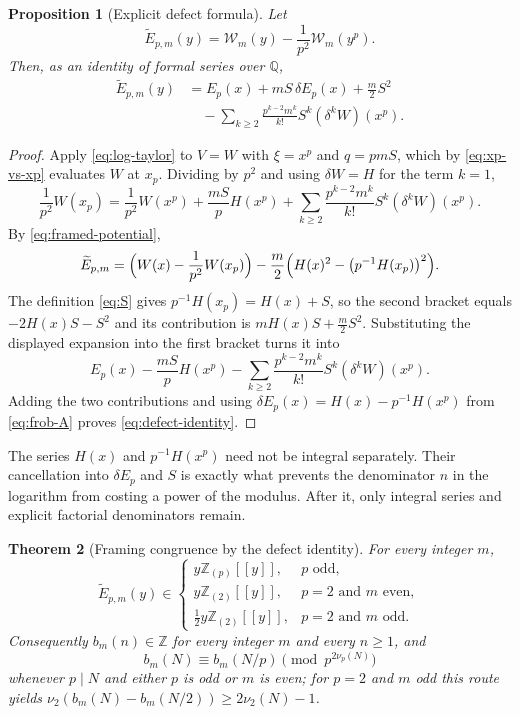 \documentclass[11pt,letterpaper]{article}
\numberwithin{equation}{section}
\newtheorem{theorem}{Theorem}[section]
\newtheorem{proposition}[theorem]{Proposition}
\theoremstyle{definition}
\newcommand{\Z}{\mathbb Z}
\newcommand{\Q}{\mathbb Q}
\newcommand{\Zp}{\Z_{(p)}}
\newcommand{\Ztwo}{\Z_{(2)}}
\newcommand{\dd}{\delta}
\newcommand{\Wm}{\mathcal W}
\begin{document}
\begin{proposition}[Explicit defect formula]\label{prop:defect-identity}
Let
\begin{equation}\label{eq:framed-defect}
\widetilde E_{p,m}(y)=\Wm_m(y)-\frac1{p^2}\Wm_m(y^p).
\end{equation}
Then, as an identity of formal series over $\Q$,
\begin{equation}\label{eq:defect-identity}
\boxed{\begin{aligned}
\widetilde E_{p,m}(y)
&=E_p(x)+mS\,\dd E_p(x)+\frac m2S^2\\
&\quad-\sum_{k\geq2}\frac{p^{k-2}m^k}{k!}S^k(\dd^kW)(x^p).
\end{aligned}}
\end{equation}
\end{proposition}

\begin{proof}
Apply \eqref{eq:log-taylor} to $V=W$ with $\xi=x^p$ and
$q=pmS$, which by \eqref{eq:xp-vs-xp} evaluates $W$ at $x_p$. Dividing by
$p^2$ and using $\dd W=H$ for the term $k=1$,
\[
\frac1{p^2}W(x_p)
=\frac1{p^2}W(x^p)+\frac{mS}{p}H(x^p)
 +\sum_{k\geq2}\frac{p^{k-2}m^k}{k!}S^k(\dd^kW)(x^p).
\]
By \eqref{eq:framed-potential},
\[
\widetilde E_{p,m}
=\Bigl(W(x)-\frac1{p^2}W(x_p)\Bigr)
 -\frac m2\Bigl(H(x)^2-\bigl(p^{-1}H(x_p)\bigr)^2\Bigr).
\]
The definition \eqref{eq:S} gives $p^{-1}H(x_p)=H(x)+S$, so the second
bracket equals $-2H(x)S-S^2$ and its contribution is
$mH(x)S+\frac m2S^2$. Substituting the displayed expansion into the
first bracket turns it into
\[
E_p(x)-\frac{mS}{p}H(x^p)
-\sum_{k\geq2}\frac{p^{k-2}m^k}{k!}S^k(\dd^kW)(x^p).
\]
Adding the two contributions and using
$\dd E_p(x)=H(x)-p^{-1}H(x^p)$ from \eqref{eq:frob-A} proves
\eqref{eq:defect-identity}.
\end{proof}

The series $H(x)$ and $p^{-1}H(x^p)$ need not be integral separately.
Their cancellation into $\dd E_p$ and $S$ is exactly what prevents the
denominator $n$ in the logarithm from costing a power of the modulus.
After it, only integral series and explicit factorial denominators remain.

\begin{theorem}[Framing congruence by the defect identity]\label{thm:defect-route}
For every integer $m$,
\begin{equation}\label{eq:defect-integrality}
\widetilde E_{p,m}(y)\in
\begin{cases}
y\Zp[[y]],&p\text{ odd},\\
y\Ztwo[[y]],&p=2\text{ and }m\text{ even},\\
\tfrac12y\Ztwo[[y]],&p=2\text{ and }m\text{ odd}.
\end{cases}
\end{equation}
Consequently $b_m(n)\in\Z$ for every integer $m$ and every $n\geq1$, and
\[
b_m(N)\equiv b_m(N/p)\pmod{p^{2\nu_p(N)}}
\]
whenever $p\mid N$ and either $p$ is odd or $m$ is even; for $p=2$ and
$m$ odd this route yields
$\nu_2(b_m(N)-b_m(N/2))\geq2\nu_2(N)-1$.
\end{theorem}
\end{document}
